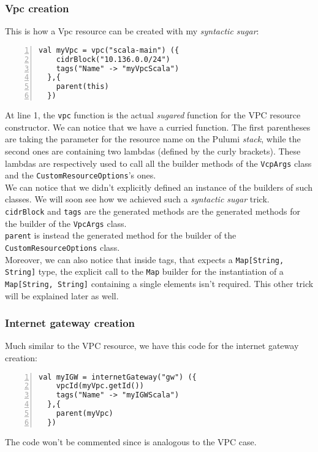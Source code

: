 \subsubsection{Vpc creation}
\label{sssec:vpc-creation-scala}
This is how a Vpc resource can be created with my \textit{syntactic sugar}:\\
\begin{minipage}{\linewidth}
\begin{lstlisting}[numbers=left, numberstyle=\tiny, numbersep=-5pt, stepnumber=1]
  val myVpc = vpc("scala-main") ({
    cidrBlock("10.136.0.0/24")
    tags("Name" -> "myVpcScala")
  },{
    parent(this)
  })
\end{lstlisting}
\end{minipage}
At line 1, the \texttt{vpc} function is the actual \textit{sugared} function for the VPC resource constructor.
We can notice that we have a curried function.
The first parentheses are taking the parameter for the resource name on the Pulumi \textit{stack}, while the second ones are containing two lambdas (defined by the curly brackets).
These lambdas are respectively used to call all the builder methods of the \texttt{VcpArgs} class and the \texttt{CustomResourceOptions}'s ones.\\
We can notice that we didn't explicitly defined an instance of the builders of such classes.
We will soon see how we achieved such a \textit{syntactic sugar} trick.\\
\texttt{cidrBlock} and \texttt{tags} are the generated methods are the generated methods for the builder of the \texttt{VpcArgs} class.\\ 
\texttt{parent} is instead the generated method for the builder of the \texttt{CustomResourceOptions} class.\\
Moreover, we can also notice that inside tags, that expects a \texttt{Map[String, String]} type, the explicit call to the \texttt{Map} builder for the instantiation of a \texttt{Map[String, String]} containing a single elements isn't required.
This other trick will be explained later as well.

\subsubsection{Internet gateway creation}
Much similar to the VPC resource, we have this code for the internet gateway creation:\\
\begin{minipage}{\linewidth}
\begin{lstlisting}[numbers=left, numberstyle=\tiny, numbersep=-5pt, stepnumber=1]
  val myIGW = internetGateway("gw") ({
    vpcId(myVpc.getId())
    tags("Name" -> "myIGWScala")
  },{
    parent(myVpc)
  })
\end{lstlisting}
\end{minipage}
The code won't be commented since is analogous to the VPC case.

